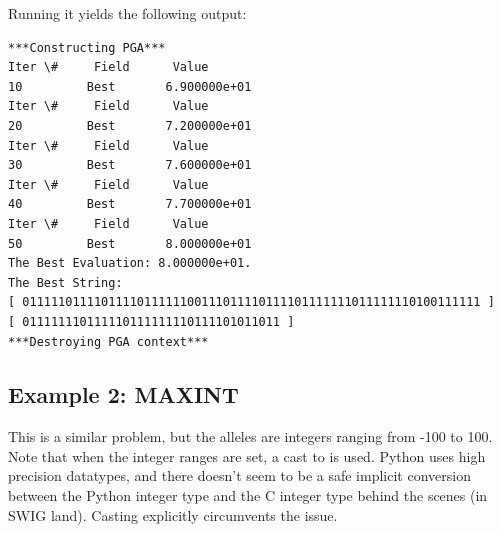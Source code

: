 \documentclass[letterpaper,11pt,english]{sphinxmanual}
\begin{document}
Running it yields the following output:

\begin{Verbatim}[commandchars=\\\{\}]
***Constructing PGA***
Iter \#     Field      Value
10         Best       6.900000e+01
Iter \#     Field      Value
20         Best       7.200000e+01
Iter \#     Field      Value
30         Best       7.600000e+01
Iter \#     Field      Value
40         Best       7.700000e+01
Iter \#     Field      Value
50         Best       8.000000e+01
The Best Evaluation: 8.000000e+01.
The Best String:
[ 0111110111101111011111100111011110111101111111011111110100111111 ]
[ 011111110111110111111110111101011011 ]
***Destroying PGA context***
\end{Verbatim}


\subsection{Example 2: MAXINT}
\label{examples:example-2-maxint}\label{examples:sec-maxintexample}
This is a similar problem, but the alleles are integers ranging
from -100 to 100.  Note that when the integer ranges are
set, a cast to  is used.  Python uses high precision
datatypes, and there doesn't seem to be a safe implicit conversion
between the Python integer type and the C integer type behind
the scenes (in SWIG land).  Casting
explicitly circumvents the issue.
\end{document}

